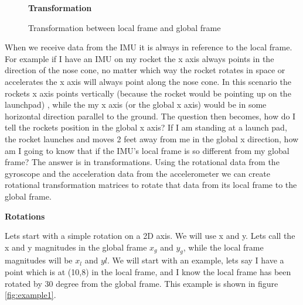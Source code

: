 \documentclass[12pt,letterpaper,boxed]{hmcpset}
\begin{document}
\begin{figure}[H]
	\centering
	\textbf{Transformation}\par\medskip
	\caption{Transformation between local frame and global frame}
	\label{fig:transform}
\end{figure}
When we receive data from the IMU it is always in reference to the local frame. For example if I have an IMU on my rocket the x axis always points in the direction of the nose cone, no matter which way the rocket rotates in space or accelerates the x axis will always point along the nose cone. In this scenario the rockets x axis points vertically (because the rocket would be pointing up on the launchpad) , while the my x axis (or the global x axis) would be in some horizontal direction parallel to the ground. The question then becomes, how do I tell the rockets position in the global x axis? If I am standing at a launch pad, the rocket launches and moves 2 feet away from me in the global x direction, how am I going to know that if the IMU's local frame is so different from my global frame? The answer is in transformations. Using the rotational data from the gyroscope and the acceleration data from the accelerometer we can create rotational transformation matrices to rotate that data from its local frame to the global frame. 

\begin{center}
\textbf{Rotations}
\end{center}
Lets start with a simple rotation on a 2D axis. We will use x and y. Lets call the x and y magnitudes in the global frame $x_{g}$ and $y_{g}$, while the local frame magnitudes will be $x_{l}$ and $y{l}$. We will start with an example, lets say I have a point which is at (10,8) in the local frame, and I know the local frame has been rotated by 30 degree from the global frame. This example is shown in figure \ref{fig:example1}.
\end{document}
